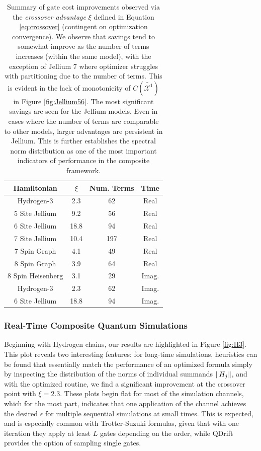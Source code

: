 \begin{table}[htbp!]
    \centering
    \begin{tabular}{| c | c | c | c |}
    \hline
        Hamiltonian & $\xi$ & Num. Terms & Time \\
        \hline
        Hydrogen-3 & 2.3 & 62 & Real \\
        5 Site Jellium & 9.2 & 56 & Real \\
        6 Site Jellium & 18.8 & 94 & Real \\
        7 Site Jellium & 10.4 & 197 & Real \\
        7 Spin Graph & 4.1 & 49 & Real \\
        8 Spin Graph & 3.9 & 64 & Real \\
        \hline
        8 Spin Heisenberg & 3.1 & 29 & Imag. \\
        Hydrogen-3 & 2.3 & 62 & Imag. \\
        6 Site Jellium & 18.8 & 94 & Imag. \\
        \hline
    \end{tabular}
    \caption{Summary of gate cost improvements observed via the \textit{crossover advantage} $\xi$ defined in Equation \ref{eq:crossover} (contingent on optimization convergence). We observe that savings tend to somewhat improve as the number of terms increases (within the same model), with the exception of Jellium 7 where optimizer struggles with partitioning due to the number of terms. This is evident in the lack of monotonicity of $C(\widetilde{\mathcal{X}^1})$ in Figure \ref{fig:Jellium56}. The most significant savings are seen for the Jellium models. Even in cases where the number of terms are comparable to other models, larger advantages are persistent in Jellium. This is further establishes the spectral norm distribution as one of the most important indicators of performance in the composite framework.}
    \label{tab:numerics_results}
\end{table} 
\FloatBarrier

\subsubsection{Real-Time Composite Quantum Simulations}
Beginning with Hydrogen chains, our results are highlighted in Figure \ref{fig:H3}. This plot reveals two interesting features: for long-time simulations, heuristics can be found that essentially match the performance of an optimized formula simply by inspecting the distribution of the norms of individual summands $\norm{H_j}$, and with the optimized routine, we find a significant improvement at the crossover point with $\xi = 2.3$. These plots begin flat for most of the simulation channels, which for the most part, indicates that one application of the channel achieves the desired $\epsilon$ for multiple sequential simulations at small times. This is expected, and is especially common with Trotter-Suzuki formulas, given that with one iteration they apply at least $L$ gates depending on the order, while QDrift provides the option of sampling single gates.

